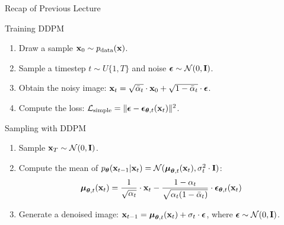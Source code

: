 \documentclass{beamer}
\begin{document}
\begin{frame}{Recap of Previous Lecture}
	\begin{block}{Training DDPM}
		\begin{enumerate}
			\item Draw a sample $\mathbf{x}_0 \sim p_{\text{data}}(\mathbf{x})$.
			\item Sample a timestep $t \sim U\{1, T\}$ and noise $\boldsymbol{\epsilon} \sim \mathcal{N}(0, \mathbf{I})$.
			\item Obtain the noisy image: $\mathbf{x}_t = \sqrt{\bar{\alpha}_t} \cdot \mathbf{x}_0 + \sqrt{1 - \bar{\alpha}_t} \cdot \boldsymbol{\epsilon}$.
			\item Compute the loss: $ \mathcal{L}_{\text{simple}} = \| \boldsymbol{\epsilon} - \boldsymbol{\epsilon}_{\boldsymbol{\theta}, t}(\mathbf{x}_t) \|^2 $.
		\end{enumerate}
	\end{block}
	\begin{block}{Sampling with DDPM}
		\begin{enumerate}
			\item Sample $\mathbf{x}_T \sim \mathcal{N}(0, \mathbf{I})$.
			\item Compute the mean of $p_{\boldsymbol{\theta}}(\mathbf{x}_{t-1} | \mathbf{x}_t) = \mathcal{N}(\boldsymbol{\mu}_{\boldsymbol{\theta}, t}(\mathbf{x}_t), \sigma_t^2 \cdot \mathbf{I})$:
			\[
				\boldsymbol{\mu}_{\boldsymbol{\theta}, t}(\mathbf{x}_t) = \frac{1}{\sqrt{\alpha_t}} \cdot \mathbf{x}_t - \frac{1 - \alpha_t}{\sqrt{\alpha_t (1 - \bar{\alpha}_t)}} \cdot \boldsymbol{\epsilon}_{\boldsymbol{\theta}, t}(\mathbf{x}_t)
			\]
			\vspace{-0.3cm}
			\item Generate a denoised image: $\mathbf{x}_{t - 1} = \boldsymbol{\mu}_{\boldsymbol{\theta}, t}(\mathbf{x}_t) +  \sigma_t \cdot \boldsymbol{\epsilon}$, where $\boldsymbol{\epsilon} \sim \mathcal{N}(0, \mathbf{I})$.
		\end{enumerate}
	\end{block}
\end{frame}
\end{document}

